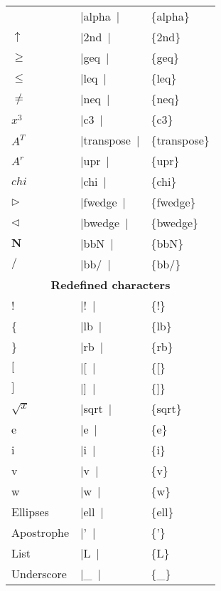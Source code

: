 \documentclass[a4paper,12pt]{article}
\newcommand{\LCDsymb}[1]{\large \textLCD{1}|{#1}~|}
\begin{document}
\begin{center}
\begin{longtable}{|l|l|>{\ttfamily}l|}
		                 & \LCDsymb{alpha}     & \{alpha\} \\
		$\uparrow$       & \LCDsymb{2nd}       & \{2nd\} \\
		$\geq$           & \LCDsymb{geq}       & \{geq\} \\
		$\leq$           & \LCDsymb{leq}       & \{leq\} \\
		$\neq$           & \LCDsymb{neq}       & \{neq\} \\
		$x^3$            & \LCDsymb{c3}        & \{c3\} \\
		$A^T$            & \LCDsymb{transpose} & \{transpose\} \\
		$A^r$            & \LCDsymb{upr}       & \{upr\} \\
		$chi$            & \LCDsymb{chi}       & \{chi\} \\
		$\triangleright$ & \LCDsymb{fwedge}    & \{fwedge\} \\
		$\triangleleft$  & \LCDsymb{bwedge}    & \{bwedge\} \\
		$\mathbf{N}$     & \LCDsymb{bbN}       & \{bbN\} \\
		$\mathbf{/}$     & \LCDsymb{bb/}       & \{bb/\} \\
		\hline
		\multicolumn{3}{c}{\textbf{Redefined characters}} \\
		\hline
		!                & \LCDsymb{!}         & \{!\} \\
		\{               & \LCDsymb{lb}        & \{lb\} \\
		\}               & \LCDsymb{rb}        & \{rb\} \\
		$[$              & \LCDsymb{[}         & \{[\} \\
		$]$              & \LCDsymb{]}         & \{]\} \\
		$\sqrt{x}$       & \LCDsymb{sqrt}      & \{sqrt\} \\
		e                & \LCDsymb{e}         & \{e\} \\
		i                & \LCDsymb{i}         & \{i\} \\
		v                & \LCDsymb{v}         & \{v\} \\
		w                & \LCDsymb{w}         & \{w\} \\
		Ellipses         & \LCDsymb{ell}       & \{ell\} \\
		Apostrophe       & \LCDsymb{'}         & \{'\} \\
		List             & \LCDsymb{L}         & \{L\} \\
		Underscore       & \LCDsymb{_}         & \{\_\} \\
		\hline
	\end{longtable}
\end{center}
\end{document}
